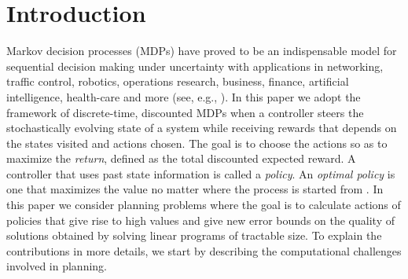\section{Introduction}
Markov decision processes (MDPs) have proved to be an indispensable model for sequential decision making under uncertainty with applications in networking, traffic control, robotics, operations research, business, finance, artificial intelligence, health-care and more (see, e.g., \cite{
White93:Apps,
rust96:book,
FeiSh02:MDPHandbook,
QiWu07,
SiBu10:MDPinAI,
BauRie:11,Puter,
LeLiu12:RLBook,
Abuetal15:MDPWireless,
BouDi17:MDPPractice}).
In this paper we adopt the framework of discrete-time, discounted MDPs when
a controller steers the stochastically evolving state of a system while receiving 
rewards that depends on the states visited and actions chosen. The goal is to choose the actions so as to maximize the \emph{return}, defined as the total discounted expected reward. A controller that uses past state information is called a \emph{policy}. An \emph{optimal policy} is one that maximizes the value no matter where the process is started from \cite{Puter}.
In this paper we consider planning problems where the goal is to calculate actions of policies that give rise to high values
 and give new error bounds on the quality of solutions obtained by solving linear programs of tractable size. 
To explain the contributions in more details, we start by describing the computational challenges involved in planning.

